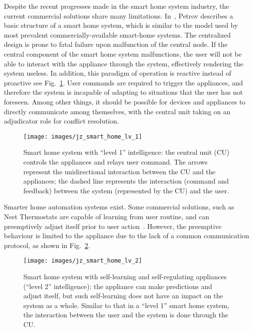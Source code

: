 \documentclass[letterpaper, twocolumn, 10pt, conference]{IEEEtran}
\begin{document}
Despite the recent progresses made in the smart home system industry, the current commercial solutions share many limitations. In~\cite{petrov2018home}, Petrov describes a basic structure of a smart home system, which is similar to the model used by most prevalent commercially-available smart-home systems. The centralized design is prone to fatal failure upon malfunction of the central node. If the central component of the smart home system malfunctions, the user will not be able to interact with the appliance through the system, effectively rendering the system useless. In addition, this paradigm of operation is reactive instead of proactive see Fig.~\ref{fig:jz:smart_home_lv_1}. User commands are required to trigger the appliances, and therefore the system is incapable of adapting to situations that the user has not foreseen. Among other things, it should be possible for devices and appliances to directly communicate among themselves, with the central unit taking on an adjudicator role for conflict resolution. 

\begin{figure}[h!]
        \centering
        \texttt{[image: images/jz\_smart\_home\_lv\_1]}
        \caption{Smart home system with \enquote{level 1} intelligence: the central unit (CU) controls the appliances and relays user command. The arrows represent the unidirectional interaction between the CU and the appliances; the dashed line represents the interaction (command and feedback) between the system (represented by the CU) and the user.}
        \label{fig:jz:smart_home_lv_1}
\end{figure}

Smarter home automation systems exist. Some commercial solutions, such as Nest Thermostats are capable of learning from user routine, and can preemptively adjust itself prior to user action~\cite{pogue2011thermostat}. However, the preemptive behaviour is limited to the appliance due to the lack of a common communication protocol, as shown in Fig.~\ref{fig:jz:smart_home_lv_2}.

\begin{figure}[h!]
        \centering
        \texttt{[image: images/jz\_smart\_home\_lv\_2]}
        \caption{Smart home system with self-learning and self-regulating appliances (\enquote{level 2} intelligence): the appliance can make predictions and adjust itself, but such self-learning does not have an impact on the system as a whole. Similar to that in a \enquote{level 1} smart home system, the interaction between the user and the system is done through the CU.}
        \label{fig:jz:smart_home_lv_2}
\end{figure}
\end{document}
